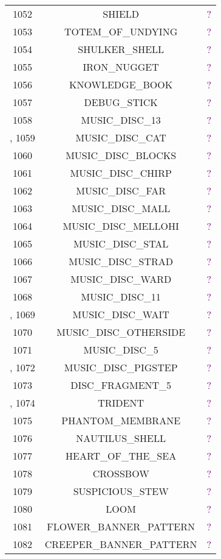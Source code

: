 \documentclass[11pt]{article}
\newcommand\myworries[1]{\textcolor{purple}{#1}}
\begin{document}
\begin{longtable}{ |c|c|c| }
	1052 & SHIELD & \myworries{?} \\
	1053 & TOTEM\_OF\_UNDYING & \myworries{?} \\
	1054 & SHULKER\_SHELL & \myworries{?} \\
	1055 & IRON\_NUGGET & \myworries{?} \\
	1056 & KNOWLEDGE\_BOOK & \myworries{?} \\
	1057 & DEBUG\_STICK & \myworries{?} \\
	1058 & MUSIC\_DISC\_13 & \myworries{?} \\,
	1059 & MUSIC\_DISC\_CAT & \myworries{?} \\
	1060 & MUSIC\_DISC\_BLOCKS & \myworries{?} \\
	1061 & MUSIC\_DISC\_CHIRP & \myworries{?} \\
	1062 & MUSIC\_DISC\_FAR & \myworries{?} \\
	1063 & MUSIC\_DISC\_MALL & \myworries{?} \\
	1064 & MUSIC\_DISC\_MELLOHI & \myworries{?} \\
	1065 & MUSIC\_DISC\_STAL & \myworries{?} \\
	1066 & MUSIC\_DISC\_STRAD & \myworries{?} \\
	1067 & MUSIC\_DISC\_WARD & \myworries{?} \\
	1068 & MUSIC\_DISC\_11 & \myworries{?} \\,
	1069 & MUSIC\_DISC\_WAIT & \myworries{?} \\
	1070 & MUSIC\_DISC\_OTHERSIDE & \myworries{?} \\
	1071 & MUSIC\_DISC\_5 & \myworries{?} \\,
	1072 & MUSIC\_DISC\_PIGSTEP & \myworries{?} \\
	1073 & DISC\_FRAGMENT\_5 & \myworries{?} \\,
	1074 & TRIDENT & \myworries{?} \\
	1075 & PHANTOM\_MEMBRANE & \myworries{?} \\
	1076 & NAUTILUS\_SHELL & \myworries{?} \\
	1077 & HEART\_OF\_THE\_SEA & \myworries{?} \\
	1078 & CROSSBOW & \myworries{?} \\
	1079 & SUSPICIOUS\_STEW & \myworries{?} \\
	1080 & LOOM & \myworries{?} \\
	1081 & FLOWER\_BANNER\_PATTERN & \myworries{?} \\
	1082 & CREEPER\_BANNER\_PATTERN & \myworries{?} \\

\end{longtable}
\end{document}
